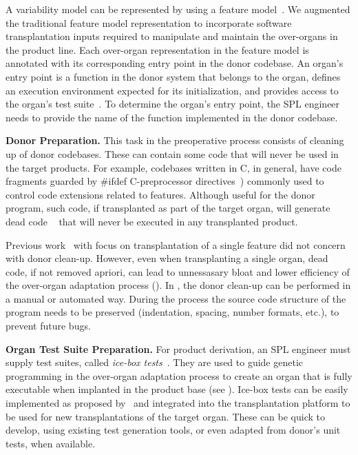 A variability model can be represented by using a feature model~\cite{Kang1990}. We augmented the traditional feature model representation to incorporate software transplantation inputs required to manipulate and maintain the over-organs in the product line. Each over-organ representation in the feature model is annotated with its corresponding entry point in the donor codebase. 
An organ's entry point is a function in the donor system that belongs to the organ, defines an execution environment expected for its initialization, and provides access to the organ's test suite~\cite{Barr2015}. To determine the organ’s entry point, the SPL engineer needs to provide the name of the function implemented in the donor codebase.

\textbf{Donor Preparation.} This task in the preoperative process consists of cleaning up of donor codebases.  
These can contain some code that will never be used in the target products.
For example, codebases written in C, in general, have code fragments guarded by \#ifdef C-preprocessor directives~\cite{Tartler2011})  commonly used to control code extensions related to features. Although useful for the donor program, such code, if transplanted as part of the target organ, will generate dead code ~\cite{Tartler2011} that will never be executed in any transplanted product.  

Previous work~\cite{Barr2015} with focus on transplantation of a single feature did not concern with donor clean-up. 
However, even when transplanting a single organ, dead code, if not removed apriori, can lead to unnessasary bloat and lower efficiency of the over-organ adaptation process (). 
In \FOUNDRY, the donor clean-up can be performed in a manual or automated way. During the process the source code structure of the program needs to be preserved (indentation, spacing, number formats, etc.), to prevent future bugs. 

\textbf{Organ Test Suite Preparation.} For product derivation, an SPL engineer must supply test suites, called \emph{ice-box tests}~\cite{Barr2015}. They are used to guide genetic programming in the over-organ adaptation process to create an organ that is fully executable when implanted in the product base (see ). 
Ice-box tests can be easily implemented as proposed by~\cite{Barr2015} and integrated into the transplantation platform to be used for new transplantations of the target organ. 
These can be quick to develop, using existing test generation tools, or even adapted from donor’s unit tests, when available.

